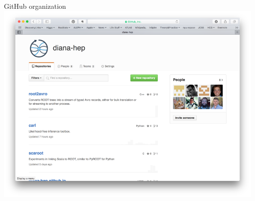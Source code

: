 \documentclass{beamer}
\begin{document}
\begin{frame}{GitHub organization}
\vspace{0.5 cm}
\includegraphics[width=\linewidth]{github_organization.png}
\end{frame}
\end{document}
